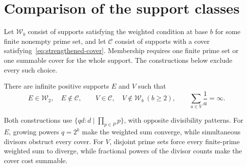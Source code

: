 \documentclass[11pt]{article}
\begin{document}
\section{Comparison of the support classes}\label{sec:comparison}
Let $\mathcal W_b$ consist of supports satisfying the weighted condition
at base $b$ for some finite nonempty prime set, and let $\mathcal C$
consist of supports with a cover satisfying~\eqref{eq:strengthened-cover}.
Membership requires one finite prime set or one summable cover for the
whole support. The constructions below exclude every such choice.

\begin{proposition}
\label{res:weighted-cover-incomparability}
There are infinite positive supports $E$ and $V$ such that
\[
 E\in\mathcal W_2,\quad E\notin\mathcal C,\qquad
 V\in\mathcal C,\quad V\notin\mathcal W_b\ (b\ge2),\qquad
 \sum_{a\in V}\frac1a=\infty.
\]
\end{proposition}

Both constructions use $\{qd:d\mid\prod_{p\in P}p\}$, with opposite
divisibility patterns. For $E$, growing powers $q=2^k$ make the weighted
sum converge, while simultaneous divisors obstruct every cover.
For $V$, disjoint prime sets force every finite-prime weighted sum to
diverge, while fractional powers of the divisor counts make the cover
cost summable.
\end{document}
